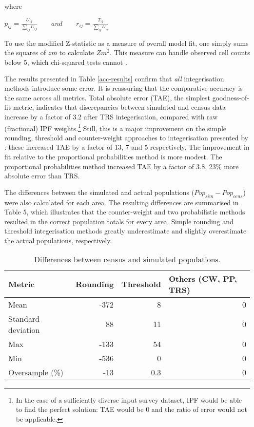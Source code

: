 where

\begin{center}
\begin{math}
  p_{ij} = \frac{U_{ij}}{\sum\limits_{ij}U_{ij}} \qquad and \qquad r_{ij} =
\frac{T_{ij}}{\sum\limits_{ij}U_{ij}}
\end{math}
\end{center}

To use the modified Z-statistic as a measure of overall model fit, one simply
sums the squares of $zm$ to calculate $Z{m}^{2}$. This measure can handle
observed cell counts below 5, which chi-squared tests cannot \citep{Voas2001}.

The results presented in Table \ref{acc-results} confirm that \emph{all}
integerisation methods introduce
some error. It is reassuring that the comparative accuracy is the same across
all metrics. Total absolute error (TAE), the simplest goodness-of-fit
metric, indicates that discrepancies between simulated and census data increase
by a factor of 3.2 after TRS integerisation, compared with raw
(fractional) IPF weights.\footnote{In the case of a sufficiently diverse input
survey dataset, IPF would be able to find the perfect solution: TAE would be 0
and the ratio of error would not be
applicable.}
Still, this is a
major improvement on the simple rounding, threshold and counter-weight
approaches to integerisation presented by \citet{Ballas2005c}: these increased
TAE by a factor of 13, 7 and 5 respectively.
The improvement in fit relative to the proportional probabilities method
is more modest. The proportional probabilities method increased TAE by a factor
of 3.8, 23\% more absolute error than TRS.

The differences between the simulated and actual populations ($Pop_{sim} -
Pop_{cens}$) were also calculated for
each area. The resulting differences are summarised in Table 5, which
illustrates that the counter-weight and two probabilistic methods resulted
in the correct population totals for every area. Simple rounding and threshold
integerisation methods greatly underestimate and slightly overestimate the
actual populations, respectively.

\begin{table}[h*]
\begin{center}
\caption{Differences between census and simulated populations.}
\vspace{0.25 cm}
\begin{tabular}{lrrr}
\toprule
Metric & \multicolumn{1}{l}{Rounding} & \multicolumn{1}{l}{Threshold} &
\multicolumn{1}{l}{Others (CW, PP, TRS)} \\ \midrule
Mean & -372 & 8 & 0  \\
Standard deviation & 88 & 11 & 0 \\
Max & -133 & 54 & 0 \\
Min & -536 & 0 & 0 \\
Oversample (\%) & -13 & 0.3 & 0 \\
\bottomrule
\end{tabular}
\end{center}
\label{t:pops}
\end{table}




